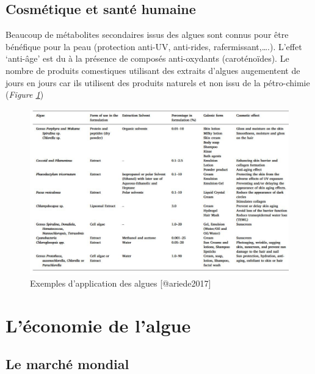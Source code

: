 \documentclass[
]{book}
\begin{document}
\hypertarget{cosmuxe9tique-et-santuxe9-humaine}{%
\subsection{Cosmétique et santé humaine}\label{cosmuxe9tique-et-santuxe9-humaine}}

Beaucoup de métabolites secondaires issus des algues sont connus pour être bénéfique pour la peau (protection anti-UV, anti-rides, rafermissant,\ldots.). L'effet `anti-âge' est du à la présence de composés anti-oxydants (caroténoïdes). Le nombre de produits comestiques utilisant des extraits d'algues augementent de jours en jours car ils utilisent des produits naturels et non issu de la pétro-chimie \citep{ariede2017} (\emph{Figure \ref{fig:cosmetique}})

\begin{figure}

{\centering \includegraphics{images/cosmetique} 

}

\caption{Exemples d'application des algues [@ariede2017]}\label{fig:cosmetique}
\end{figure}

\hypertarget{luxe9conomie-de-lalgue}{%
\section{L'économie de l'algue}\label{luxe9conomie-de-lalgue}}

\hypertarget{le-marchuxe9-mondial}{%
\subsection{Le marché mondial}\label{le-marchuxe9-mondial}}
\end{document}
